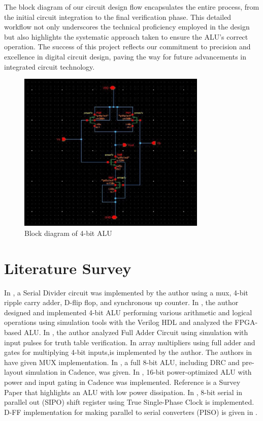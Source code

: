 \documentclass[conference]{IEEEtran}
\begin{document}
The block diagram of our circuit design flow encapsulates the entire process, from the initial circuit integration to the final verification phase. This detailed workflow not only underscores the technical proficiency employed in the design but also highlights the systematic approach taken to ensure the ALU's correct operation. The success of this project reflects our commitment to precision and excellence in digital circuit design, paving the way for future advancements in integrated circuit technology.
\begin{figure}[htbp]
\centerline{\includegraphics[width=9cm,keepaspectratio,]{"1bit_NAND.png"}}
\caption{Block diagram of 4-bit ALU}
\label{fig1}
\end{figure}


\section{Literature Survey}\label{B}
In \cite{b1}, a Serial Divider circuit was implemented by the author using a mux, 4-bit ripple carry adder, D-flip flop, and synchronous up counter. In \cite{b2}, the author designed and implemented 4-bit ALU performing various arithmetic and logical operations using simulation tools with the Verilog HDL and analyzed the FPGA-based ALU. In \cite{b3}, the author analyzed Full Adder Circuit using simulation with input pulses for truth table verification. In \cite{b4} array multipliers using full adder and gates for multiplying 4-bit inputs,is implemented by the author. The authors in \cite{b5} have given MUX implementation. In \cite{b6}, a full 8-bit ALU, including DRC and pre-layout simulation in Cadence, was given. In \cite{b7}, 16-bit power-optimized ALU with power and input gating in Cadence was implemented. Reference \cite{b8} is a Survey Paper that highlights an ALU with low power dissipation. In \cite{b9}, 8-bit serial in parallel out (SIPO) shift register using True Single-Phase Clock is implemented. D-FF implementation for making parallel to serial converters (PISO) is given in \cite{b10}.
\\
\end{document}
